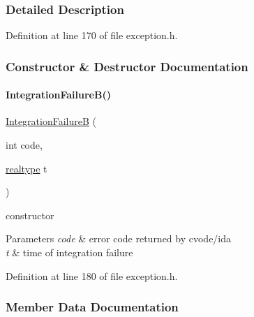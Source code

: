 \subsubsection{Detailed Description}


Definition at line 170 of file exception.\+h.



\subsubsection{Constructor \& Destructor Documentation}
\mbox{\label{classamici_1_1_integration_failure_b_ad87179c92d6479d56fb3977efa1dc481}} 
\paragraph{\texorpdfstring{IntegrationFailureB()}{IntegrationFailureB()}}
{\footnotesize\ttfamily \mbox{\hyperlink{classamici_1_1_integration_failure_b}{Integration\+FailureB}} (\begin{DoxyParamCaption}\item[{int}]{code,  }\item[{\mbox{\hyperlink{namespaceamici_a1bdce28051d6a53868f7ccbf5f2c14a3}{realtype}}}]{t }\end{DoxyParamCaption})}

constructor 
\begin{DoxyParams}{Parameters}
{\em code} & error code returned by cvode/ida \\
\hline
{\em t} & time of integration failure \\
\hline
\end{DoxyParams}


Definition at line 180 of file exception.\+h.



\subsubsection{Member Data Documentation}
\mbox{\label{classamici_1_1_integration_failure_b_a7d16b1c68c87cec009d972e79abfba78}} 
